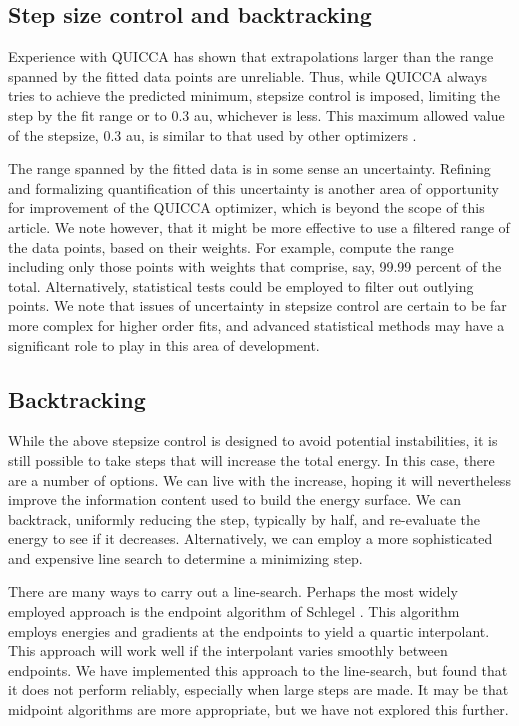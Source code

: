 \documentclass[prl,twocolumn,showpacs,twocolumngrid,superbib]{revtex4}
\begin{document}
\subsection{Step size control and backtracking}

Experience with QUICCA has shown that extrapolations larger 
than the range spanned by the fitted data points are unreliable.   Thus, 
while QUICCA  always tries to achieve the predicted minimum, 
stepsize control is imposed, limiting the step  by  the fit range or to 
0.3 au, whichever is less.   This maximum allowed value of the stepsize, 0.3 au, 
is similar to that used by other optimizers \cite{eckert}.  

The range spanned by the fitted data is in some sense an uncertainty.  
Refining and formalizing quantification of this uncertainty is another area of 
opportunity for improvement of the QUICCA optimizer, which is beyond the 
scope of this article.  We note however, that it might be more effective
to use a filtered range of the data points, based on their weights. 
For example, compute the range including only those points with weights that 
comprise, say,  99.99 percent of the total.   Alternatively, statistical 
tests could be employed to filter out outlying points.  We note that issues of
uncertainty in stepsize control are certain to be far more complex for higher 
order fits, and advanced statistical methods may have a significant role 
to play in this area of development.

\subsection{Backtracking}

While the above stepsize control is designed to avoid potential instabilities,
it is still possible to take steps that will increase the total energy.  In 
this case, there are a number of options.  We can live with the increase, 
hoping it will nevertheless improve the information content used to build the energy 
surface.  We can backtrack, uniformly reducing the step, typically by half, and re-evaluate
the energy to see if it decreases.   Alternatively, we can employ a more 
sophisticated and expensive line search to determine a minimizing step.  

There are many ways to carry out a line-search.  Perhaps the most widely employed 
approach is the endpoint algorithm of Schlegel \cite{sclegel_linesearch}.  This algorithm
employs energies and gradients at the endpoints to yield a quartic interpolant.  This
approach will work well if the interpolant varies smoothly between endpoints.  We have
implemented this approach to the line-search, but found that it does not perform 
reliably, especially when large steps are made.   It may be that midpoint algorithms
are more appropriate, but we have not explored this further.
\end{document}
